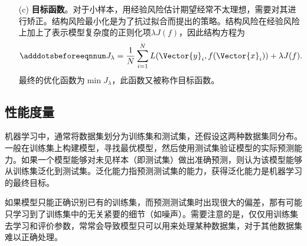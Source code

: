 \begin{itemize}
  \item[(c)] \textbf{目标函数}。对于小样本，用经验风险估计期望经常不太理想，需要对其进行矫正。结构风险最小化是为了抗过拟合而提出的策略。结构风险在经验风险上加上了表示模型复杂度的正则化项$\lambda J(f)$，因此结构方程为
  \begin{equation}\adddotsbeforeeqnnum
    \label{eq:ml_loss_structure}
    J_{\lambda}=\frac{1}{N}\sum_{i=1}^{N}L(\Vector{y}_i,f(\Vector{x}_i))+\lambda J(f).
  \end{equation}
  最终的优化函数为$\min J_{\lambda}$，此函数又被称作目标函数。
\end{itemize}

\subsection{性能度量}\label{sec:ml_performance}

机器学习中，通常将数据集划分为训练集和测试集，还假设这两种数据集同分布。一般在训练集上构建模型，寻找最优模型，然后使用测试集验证模型的实际预测能力。如果一个模型能够对未见样本（即测试集）做出准确预测，则认为该模型能够从训练集泛化到测试集。泛化能力指预测测试集的能力，获得泛化能力是机器学习的最终目标。

如果模型只能正确识别已有的训练集，而预测测试集时出现很大的偏差，那有可能只学习到了训练集中的无关紧要的细节（如噪声）。需要注意的是，仅仅用训练集去学习和评价参数，常常会导致模型只可以用来处理某种数据集，对于其他数据集难以正确处理。

